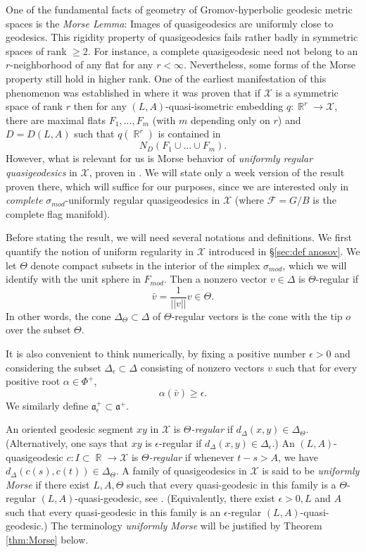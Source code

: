 \documentclass[12pt]{amsbook}%
\theoremstyle{definition}
\theoremstyle{remark}
\numberwithin{section}{chapter}
\numberwithin{subsection}{section}
\numberwithin{figure}{chapter}
\DeclareMathOperator{\R}{\mathbb{R}}
\def\eps{\epsilon}
\def\simod{\sigma_{mod}}
\def\Fmod{F_{mod}}
\def\cF{{\mathscr{F}}}
\def\cX{{\mathscr{X}}}
\begin{document}
{{One of the fundamental facts of geometry of Gromov-hyperbolic geodesic metric spaces is the {\em Morse Lemma}: Images of quasigeodesics are uniformly close to geodesics. This rigidity property of quasigeodesics fails rather badly in symmetric spaces of rank $\geqslant 2$. For instance, a complete quasigeodesic need not belong to an $r$-neighborhood of any flat for any $r<\infty$. Nevertheless, some forms of the Morse property still hold in higher rank. One of the earliest manifestation of this phenomenon was established in \cite{Kleiner-Leeb} where it was proven that if $\cX$ is a symmetric space of rank $r$ then for any $(L,A)$-quasi-isometric   embedding $q: \R^r\to \cX$, there are maximal flats $F_1,...,F_m$ (with $m$ depending only on $r$) 
and $D=D(L,A)$ such that $q(\R^r)$ is contained in 
$$
N_D(F_1\cup...\cup F_m).
$$
However, what is relevant for us is Morse behavior of {\em uniformly regular quasigeodesics} in $\cX$, proven in \cite{KLP18}. We will state only a week version of the result proven there, which will suffice for our purposes, since we are interested only in {\em complete} 
$\simod$-uniformly regular quasigeodesics  in $\cX$ (where $\cF=G/B$ is the complete flag manifold). 

Before stating the result, we will need several notations and definitions. We first quantify the notion of uniform regularity in $\cX$ introduced in 
\S \ref{sec:def anosov}. We let $\Theta$ denote compact subsets in the interior of the simplex $\simod$, which we will identify with the unit sphere in $\Fmod$. Then a nonzero vector $v\in \Delta$ is $\Theta$-regular if 
$$
\bar{v}=\frac{1}{||v||}v\in \Theta. 
$$  
In other words, the cone $\Delta_\Theta\subset \Delta$ of $\Theta$-regular vectors is the cone with the tip $o$ over the subset $\Theta$. 


It is also convenient to think numerically, by fixing a positive number $\eps>0$ and considering the subset $\Delta_\eps\subset \Delta$ consisting of nonzero vectors $v$ such that for every positive root $\alpha\in \Phi^+$,
$$
\alpha(\bar{v})\geqslant \eps. 
$$
We similarly define $\mathfrak{a}_\eps^+\subset \mathfrak{a}^+$. 

An oriented geodesic segment $xy$ in $\cX$ is {\em $\Theta$-regular} if $d_\Delta(x,y)\in \Delta_\Theta$. 
(Alternatively, one says that $xy$ is $\eps$-regular if  $d_\Delta(x,y)\in \Delta_\eps$.) 
An $(L,A)$-quasigeodesic $c: I\subset \R\to \cX$ is {\em $\Theta$-regular} if whenever $t-s> A$, we have $d_\Delta(c(s), c(t))\in \Delta_\Theta$.
A family of quasigeodesics in $\cX$ is said to be {\em uniformly Morse} if there exist $L, A, \Theta$ such that every quasi-geodesic in this family 
is a $\Theta$-regular $(L,A)$-quasi-geodesic, see \cite{KLP14, KLP18}. 
(Equivalently, there exist $\eps> 0, L $ and $A$ such that every quasi-geodesic in this family 
is an $\eps$-regular $(L,A)$-quasi-geodesic.) The terminology {\em uniformly Morse} will be justified by Theorem \ref{thm:Morse} below. 

}}
\end{document}
